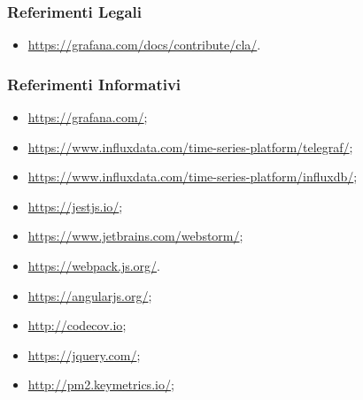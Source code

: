 \subsubsection{Referimenti Legali}
\begin{itemize}
	\item \url{https://grafana.com/docs/contribute/cla/}.
\end{itemize}

\subsubsection{Referimenti Informativi}
\begin{itemize}
	\item \url{https://grafana.com/};
	\item \url{https://www.influxdata.com/time-series-platform/telegraf/};
	\item \url{https://www.influxdata.com/time-series-platform/influxdb/};
	\item \url{https://jestjs.io/};
	\item \url{https://www.jetbrains.com/webstorm/};
	\item \url{https://webpack.js.org/}.
	\item \url{https://angularjs.org/};
	\item \url{http://codecov.io};
	\item \url{https://jquery.com/};
	\item \url{http://pm2.keymetrics.io/};
\end{itemize}